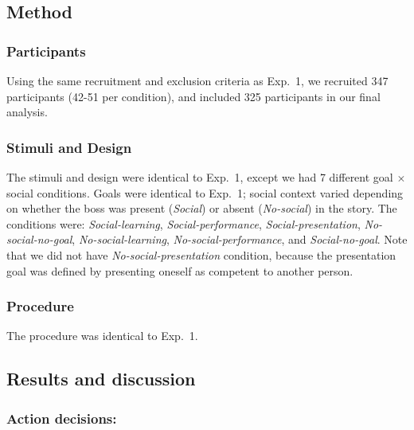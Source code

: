 \documentclass[10pt, letterpaper]{article}
\begin{document}
\hypertarget{method-1}{%
\subsection{Method}\label{method-1}}

\hypertarget{participants-1}{%
\subsubsection{Participants}\label{participants-1}}

Using the same recruitment and exclusion criteria as Exp.~1, we
recruited 347 participants (42-51 per condition), and included 325
participants in our final analysis.

\hypertarget{stimuli-and-design-1}{%
\subsubsection{Stimuli and Design}\label{stimuli-and-design-1}}

The stimuli and design were identical to Exp.~1, except we had 7
different goal \(\times\) social conditions. Goals were identical to
Exp.~1; social context varied depending on whether the boss was present
(\emph{Social}) or absent (\emph{No-social}) in the story. The
conditions were: \emph{Social-learning}, \emph{Social-performance},
\emph{Social-presentation}, \emph{No-social-no-goal},
\emph{No-social-learning}, \emph{No-social-performance}, and
\emph{Social-no-goal}. Note that we did not have
\emph{No-social-presentation} condition, because the presentation goal
was defined by presenting oneself as competent to another person.

\hypertarget{procedure-1}{%
\subsubsection{Procedure}\label{procedure-1}}

The procedure was identical to Exp.~1.

\hypertarget{results-and-discussion-1}{%
\subsection{Results and discussion}\label{results-and-discussion-1}}

\hypertarget{action-decisions-1}{%
\subsubsection{Action decisions:}\label{action-decisions-1}}
\end{document}
